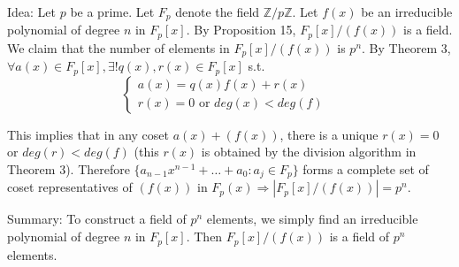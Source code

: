 \documentclass[12pt]{article}
\theoremstyle{definition}
\begin{document}
\par Idea: Let $p$ be a prime. Let $F_p$ denote the field $\mathbb{Z}/p\mathbb{Z}$. Let $f(x)$ be an irreducible polynomial of degree $n$ in $F_p[x]$. By Proposition 15, $F_p[x]/(f(x))$ is a field. We claim that the number of elements in $F_p[x]/(f(x))$ is $p^n$. By Theorem 3, $\forall a(x) \in F_p[x], \exists ! q(x), r(x) \in F_p[x]$ s.t.
\[
	\begin{cases}
		a(x) = q(x) f(x) + r(x)              & \\
		r(x) = 0 \text{ or } deg(x) < deg(f) &
	\end{cases}
\]
\par This implies that in any coset $a(x) + (f(x))$, there is a unique $r(x) = 0$ or $deg(r) < deg(f)$ (this $r(x)$ is obtained by the division algorithm in Theorem 3). Therefore $\{a_{n - 1} x^{n - 1} + \hdots + a_0: a_j \in F_p\}$ forms a complete set of coset representatives of $(f(x))$ in $F_p(x) \Rightarrow |F_p[x]/(f(x))| = p^n$.

\par Summary: To construct a field of $p^n$ elements, we simply find an irreducible polynomial of degree $n$ in $F_p[x]$. Then $F_p[x]/(f(x))$ is a field of $p^n$ elements.

\end{document}
